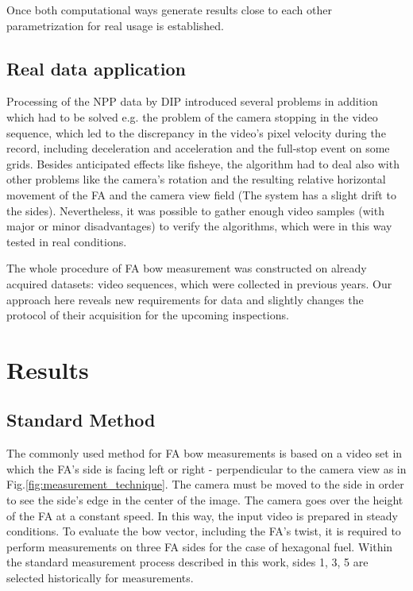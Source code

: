 \documentclass[preprint,12pt]{elsarticle}
\begin{document}
Once both computational ways generate results close to each other parame\-trization for real usage is established.

\subsection{Real data application}
Processing of the \ac{NPP} data by \ac{DIP} introduced several problems in addition which had to be solved e.g. the problem of the camera stopping in the video sequence, which led to the discrepancy in the video's pixel velocity during the record, including deceleration and acceleration and the full-stop event on some grids. Besides anticipated effects like fisheye, the algorithm had to deal also with other problems like the camera's rotation and the resulting relative horizontal movement of the \ac{FA} and the camera view field (The system has a slight drift to the sides). Nevertheless, it was possible to gather enough video samples (with major or minor disadvantages) to verify the algorithms, which were in this way tested in real conditions.

The whole procedure of \ac{FA} bow measurement was constructed on already acquired datasets: video sequences, which were collected in previous years. Our approach here reveals new requirements for data and slightly changes the protocol of their acquisition for the upcoming inspections.

\section{Results}

\subsection{Standard Method} 

The commonly used method for \ac{FA} bow measurements is based on a video set in which the \ac{FA}'s side is facing left or right - perpendicular to the camera view as in Fig.\ref{fig:measurement_technique}. The camera must be moved to the side in order to see the side's edge in the center of the image. The camera goes over the height of the \ac{FA} at a constant speed. In this way, the input video is prepared in steady conditions. To evaluate the bow vector, including the \ac{FA}'s twist, it is required to perform measurements on three \ac{FA} sides for the case of hexagonal fuel. Within the standard measurement process described in this work, sides 1, 3, 5 are selected historically for measurements.
\end{document}
